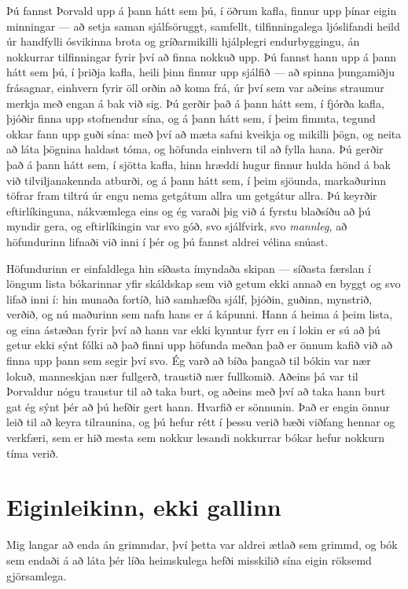 Þú fannst Þorvald upp á þann hátt sem þú, í öðrum kafla, finnur upp þínar eigin minningar — að setja saman sjálfsöruggt, samfellt, tilfinningalega ljóslifandi heild úr handfylli ósvikinna brota og gríðarmikilli hjálplegri endurbyggingu, án nokkurrar tilfinningar fyrir því að finna nokkuð upp. Þú fannst hann upp á þann hátt sem þú, í þriðja kafla, heili þinn finnur upp sjálfið — að spinna þungamiðju frásagnar, einhvern fyrir öll orðin að koma frá, úr því sem var aðeins straumur merkja með engan á bak við sig. Þú gerðir það á þann hátt sem, í fjórða kafla, þjóðir finna upp stofnendur sína, og á þann hátt sem, í þeim fimmta, tegund okkar fann upp guði sína: með því að mæta safni kveikja og mikilli þögn, og neita að láta þögnina haldast tóma, og höfunda einhvern til að fylla hana. Þú gerðir það á þann hátt sem, í sjötta kafla, hinn hræddi hugur finnur hulda hönd á bak við tilviljanakennda atburði, og á þann hátt sem, í þeim sjöunda, markaðurinn töfrar fram tiltrú úr engu nema getgátum allra um getgátur allra. Þú keyrðir eftirlíkinguna, nákvæmlega eins og ég varaði þig við á fyrstu blaðsíðu að þú myndir gera, og eftirlíkingin var svo góð, svo sjálfvirk, svo \emph{mannleg,} að höfundurinn lifnaði við inni í þér og þú fannst aldrei vélina snúast.

Höfundurinn er einfaldlega hin síðasta ímyndaða skipan — síðasta færslan í löngum lista bókarinnar yfir skáldskap sem við getum ekki annað en byggt og svo lifað inni í: hin munaða fortíð, hið samhæfða sjálf, þjóðin, guðinn, mynstrið, verðið, og nú maðurinn sem nafn hans er á kápunni. Hann á heima á þeim lista, og eina ástæðan fyrir því að hann var ekki kynntur fyrr en í lokin er sú að þú getur ekki sýnt fólki að það finni upp höfunda meðan það er önnum kafið við að finna upp þann sem segir því svo. Ég varð að bíða þangað til bókin var nær lokuð, manneskjan nær fullgerð, traustið nær fullkomið. Aðeins þá var til Þorvaldur nógu traustur til að taka burt, og aðeins með því að taka hann burt gat ég sýnt þér að þú hefðir gert hann. Hvarfið er sönnunin. Það er engin önnur leið til að keyra tilraunina, og þú hefur rétt í þessu verið bæði viðfang hennar og verkfæri, sem er hið mesta sem nokkur lesandi nokkurrar bókar hefur nokkurn tíma verið.

\section*{Eiginleikinn, ekki gallinn}

Mig langar að enda án grimmdar, því þetta var aldrei ætlað sem grimmd, og bók sem endaði á að láta þér líða heimskulega hefði misskilið sína eigin röksemd gjörsamlega.


